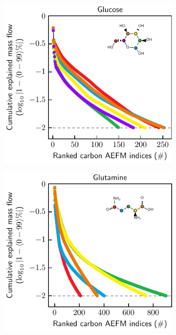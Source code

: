 \documentclass[]{article}
\begin{document}
\begin{figure}
\begin{subfigure}[t]{0.247\textwidth}
    \end{subfigure}
    \begin{subfigure}[t]{0.247\textwidth}
        \caption{}
        \includegraphics[width=\textwidth]{subpanels/cumulative-source-met-13-log.pdf}\\
    \end{subfigure}
    \begin{subfigure}[t]{0.247\textwidth}
        \caption{}
        \includegraphics[width=\textwidth]{subpanels/cumulative-source-met-14-log.pdf}\\
    \end{subfigure}


\end{figure}
\end{document}
